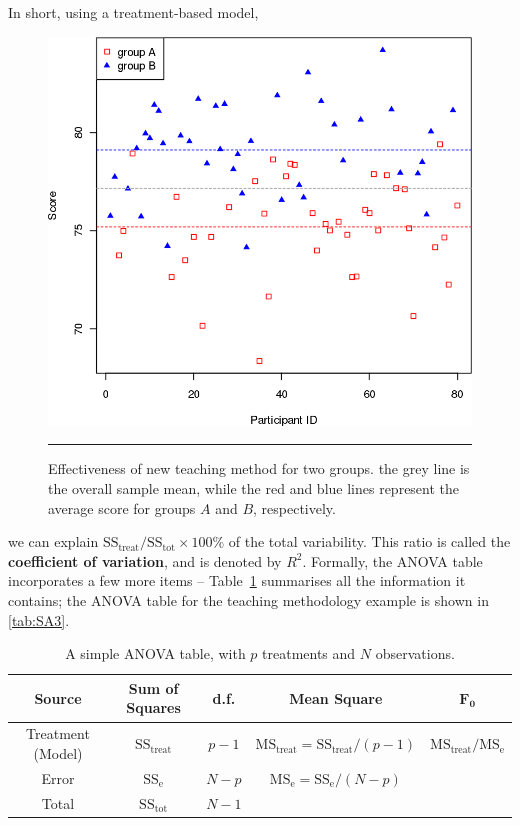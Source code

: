 \par In short, using a treatment-based model, \begin{figure}[!t]
\centering
  \includegraphics[width=0.5\linewidth]{images/SA/testA2.png}
  \caption[\small Effectiveness of new teaching method (two groups)]{\small Effectiveness of new teaching method for two groups. the grey line is the overall sample mean, while the red and blue lines represent the average score for groups $A$ and $B$, respectively.}
  \label{fig:testA2}\hrule
\end{figure} we can explain $\text{SS}_{\textrm{treat}}/\text{SS}_{\textrm{tot}}\times 100\%$ of the total variability. This ratio is called the \textbf{coefficient of variation}, and is denoted by $R^{2}$.
\newl Formally, the ANOVA table incorporates a few more items -- Table~\ref{tab:SA2} summarises all the information it contains; the ANOVA table for the teaching methodology example is shown in \ref{tab:SA3}.

     \begin{table}[!t]
         \centering
         \begin{tabular}{c c c c c}
         \hline
        \textbf{Source} & \textbf{Sum of Squares} & \textbf{d.f.} & \textbf{Mean Square} & $\mathbf{F_{0}}$ \\
         \hline
         Treatment (Model) & $\text{SS}_{\textrm{treat}}$ & $p-1$ & $\text{MS}_{\textrm{treat}}=\text{SS}_{\textrm{treat}}/(p-1)$ & $\text{MS}_{\textrm{treat}}/\text{MS}_{\textrm{e}}$\\
         Error & $\text{SS}_{\textrm{e}}$ & $N-p$ & $\text{MS}_{\textrm{e}}=\text{SS}_{\textrm{e}}/(N-p)$ \\
         Total & $\text{SS}_{\textrm{tot}}$ & $N-1$\\
        \hline
         \end{tabular}
         \caption[\small A simple ANOVA table]{\small A simple ANOVA table, with $p$ treatments and $N$ observations.}
         \label{tab:SA2}
     \end{table}


